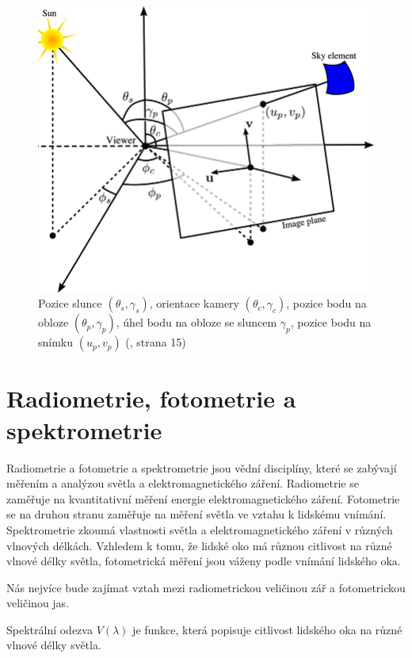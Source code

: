 \begin{figure}[h]\centering
  \includegraphics[width=140mm]{../img/uhly}
  \caption{Pozice slunce $(\theta_s, \gamma_s)$, orientace kamery $(\theta_c, \gamma_c)$, pozice bodu na obloze $(\theta_p, \gamma_p)$, úhel bodu na obloze se sluncem $\gamma_p$, pozice bodu na snímku $(u_p, v_p)$
  (\citealp{Lalonde10}, strana 15)}
\end{figure}

\section{Radiometrie, fotometrie a spektrometrie}
Radiometrie a fotometrie a spektrometrie jsou vědní disciplíny, které se zabývají měřením a analýzou světla a elektromagnetického záření. 
Radiometrie se zaměřuje na kvantitativní měření energie elektromagnetického záření.
Fotometrie se na druhou stranu zaměřuje na měření světla ve vztahu k lidskému vnímání.
Spektrometrie zkoumá vlastnosti světla a elektromagnetického záření v různých vlnových délkách.
Vzhledem k tomu, že lidské oko má různou citlivost na různé vlnové délky světla, fotometrická měření jsou váženy podle vnímání lidského oka. 

Nás nejvíce bude zajímat vztah mezi radiometrickou veličinou zář a fotometrickou veličinou jas.


\begin{definice}
  Spektrální odezva $V(\lambda)$ je funkce, která popisuje citlivost lidského oka na různé vlnové délky světla.
\end{definice}

